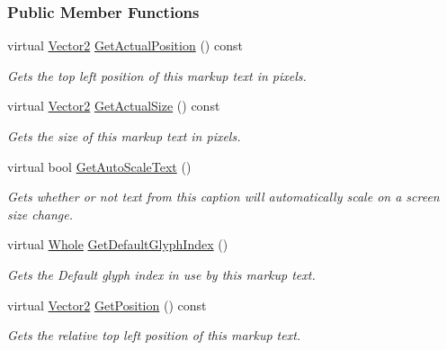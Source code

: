 \subsubsection*{Public Member Functions}
\begin{DoxyCompactItemize}
\item 
virtual \hyperlink{classMezzanine_1_1Vector2}{Vector2} \hyperlink{classMezzanine_1_1UI_1_1MarkupText_a43d868461d8cc3a230e13e97cd38d91d}{GetActualPosition} () const 
\begin{DoxyCompactList}\small\item\em Gets the top left position of this markup text in pixels. \item\end{DoxyCompactList}\item 
virtual \hyperlink{classMezzanine_1_1Vector2}{Vector2} \hyperlink{classMezzanine_1_1UI_1_1MarkupText_a5e54183333fc3e120da6383e319c436e}{GetActualSize} () const 
\begin{DoxyCompactList}\small\item\em Gets the size of this markup text in pixels. \item\end{DoxyCompactList}\item 
virtual bool \hyperlink{classMezzanine_1_1UI_1_1MarkupText_a7ce89b8725dbb2ccecf1c363d61d048f}{GetAutoScaleText} ()
\begin{DoxyCompactList}\small\item\em Gets whether or not text from this caption will automatically scale on a screen size change. \item\end{DoxyCompactList}\item 
virtual \hyperlink{namespaceMezzanine_adcbb6ce6d1eb4379d109e51171e2e493}{Whole} \hyperlink{classMezzanine_1_1UI_1_1MarkupText_a15ad39e454825140090eb7a0bedd0c76}{GetDefaultGlyphIndex} ()
\begin{DoxyCompactList}\small\item\em Gets the Default glyph index in use by this markup text. \item\end{DoxyCompactList}\item 
virtual \hyperlink{classMezzanine_1_1Vector2}{Vector2} \hyperlink{classMezzanine_1_1UI_1_1MarkupText_a9fb5509afd9a1c1e3de3b470c8755bd0}{GetPosition} () const 
\begin{DoxyCompactList}\small\item\em Gets the relative top left position of this markup text. \item\end{DoxyCompactList}\item 

\end{DoxyCompactItemize}
